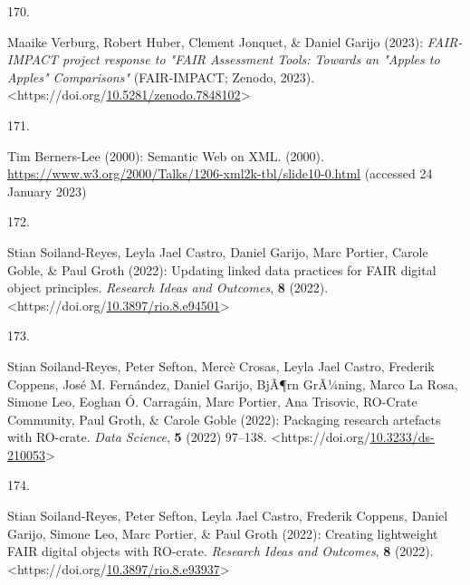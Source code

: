 \begin{thebibliography}{9}
\hypertarget{ref-10.5281ux2fzenodo.7848102}{}
170.

Maaike Verburg, Robert Huber, Clement Jonquet, \& Daniel Garijo (2023):
\emph{{FAIR-IMPACT project response to "FAIR Assessment Tools: Towards
an "Apples to Apples" Comparisons"}} ({FAIR-IMPACT}; Zenodo, 2023).
\textless https://doi.org/\href{https://doi.org/10.5281/zenodo.7848102}{10.5281/zenodo.7848102}\textgreater{}

\hypertarget{ref-SemanticWebXML2000}{}
171.

Tim Berners-Lee (2000): {Semantic Web on XML}. (2000).
\url{https://www.w3.org/2000/Talks/1206-xml2k-tbl/slide10-0.html}
(accessed 24 January 2023)

\hypertarget{ref-10.3897ux2frio.8.e94501}{}
172.

Stian Soiland-Reyes, Leyla Jael Castro, Daniel Garijo, Marc Portier,
Carole Goble, \& Paul Groth (2022): Updating linked data practices for
{FAIR} digital object principles. \emph{Research Ideas and Outcomes},
\textbf{8} (2022).
\textless https://doi.org/\href{https://doi.org/10.3897/rio.8.e94501}{10.3897/rio.8.e94501}\textgreater{}

\hypertarget{ref-10.3233ux2fds-210053}{}
173.

Stian Soiland-Reyes, Peter Sefton, Mercè Crosas, Leyla Jael Castro,
Frederik Coppens, José M. Fernández, Daniel Garijo, BjÃ¶rn GrÃ¼ning,
Marco La Rosa, Simone Leo, Eoghan Ó. Carragáin, Marc Portier, Ana
Trisovic, RO-Crate Community, Paul Groth, \& Carole Goble (2022):
Packaging research artefacts with {RO}-crate. \emph{Data Science},
\textbf{5} (2022) 97--138.
\textless https://doi.org/\href{https://doi.org/10.3233/ds-210053}{10.3233/ds-210053}\textgreater{}

\hypertarget{ref-10.3897ux2frio.8.e93937}{}
174.

Stian Soiland-Reyes, Peter Sefton, Leyla Jael Castro, Frederik Coppens,
Daniel Garijo, Simone Leo, Marc Portier, \& Paul Groth (2022): Creating
lightweight {FAIR} digital objects with {RO}-crate. \emph{Research Ideas
and Outcomes}, \textbf{8} (2022).
\textless https://doi.org/\href{https://doi.org/10.3897/rio.8.e93937}{10.3897/rio.8.e93937}\textgreater{}



\end{thebibliography}